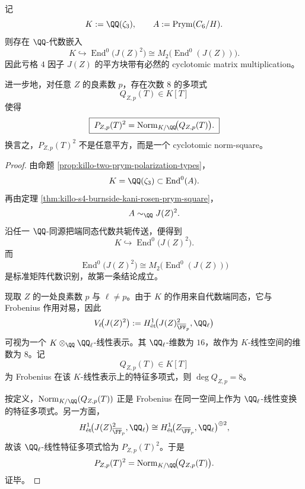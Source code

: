 \begin{conclusion}\label{con:xi-time-part9n-s4-jz2-cyclotomic-norm-square}
记
\[
K:=\QQ(\zeta_3),\qquad A:=\operatorname{Prym}(C_6/H).
\]
则存在 \(\QQ\)-代数嵌入
\[
\boxed{\;
K\hookrightarrow \operatorname{End}^0\!\bigl(J(Z)^2\bigr)
\cong
M_2\!\bigl(\operatorname{End}^0(J(Z))\bigr).
\;}
\]
因此亏格 \(4\) 因子 \(J(Z)\) 的平方块带有必然的 cyclotomic matrix multiplication。

进一步地，对任意 \(Z\) 的良素数 \(p\)，存在次数 \(8\) 的多项式
\[
Q_{Z,p}(T)\in K[T]
\]
使得
\[
\boxed{\;
P_{Z,p}(T)^2=
\operatorname{Norm}_{K/\QQ}\!\bigl(Q_{Z,p}(T)\bigr).
\;}
\]
换言之，\(P_{Z,p}(T)^2\) 不是任意平方，而是一个 cyclotomic norm-square。
\end{conclusion}
\begin{proof}
由命题 \ref{prop:killo-two-prym-polarization-types}，
\[
K=\QQ(\zeta_3)\subset \operatorname{End}^0(A).
\]
再由定理 \ref{thm:killo-s4-burnside-kani-rosen-prym-square}，
\[
A\sim_{\QQ}J(Z)^2.
\]
沿任一 \(\QQ\)-同源把端同态代数共轭传送，便得到
\[
K\hookrightarrow \operatorname{End}^0\!\bigl(J(Z)^2\bigr).
\]
而
\[
\operatorname{End}^0\!\bigl(J(Z)^2\bigr)\cong M_2\!\bigl(\operatorname{End}^0(J(Z))\bigr)
\]
是标准矩阵代数识别，故第一条结论成立。

现取 \(Z\) 的一处良素数 \(p\) 与 \(\ell\neq p\)。由于 \(K\) 的作用来自代数端同态，它与 Frobenius 作用对易，因此
\[
V_\ell\!\bigl(J(Z)^2\bigr):=
H^1_{\text{ét}}\!\bigl(J(Z)^2_{\overline{\FF}_p},\QQ_\ell\bigr)
\]
可视为一个 \(K\otimes_{\QQ}\QQ_\ell\)-线性表示。其 \(\QQ_\ell\)-维数为 \(16\)，故作为 \(K\)-线性空间的维数为 \(8\)。记
\[
Q_{Z,p}(T)\in K[T]
\]
为 Frobenius 在该 \(K\)-线性表示上的特征多项式，则 \(\deg Q_{Z,p}=8\)。

按定义，\(\operatorname{Norm}_{K/\QQ}(Q_{Z,p}(T))\) 正是 Frobenius 在同一空间上作为 \(\QQ_\ell\)-线性变换的特征多项式。另一方面，
\[
H^1_{\text{ét}}\!\bigl(J(Z)^2_{\overline{\FF}_p},\QQ_\ell\bigr)
\cong
H^1_{\text{ét}}\!\bigl(Z_{\overline{\FF}_p},\QQ_\ell\bigr)^{\oplus 2},
\]
故该 \(\QQ_\ell\)-线性特征多项式恰为 \(P_{Z,p}(T)^2\)。于是
\[
P_{Z,p}(T)^2=
\operatorname{Norm}_{K/\QQ}\!\bigl(Q_{Z,p}(T)\bigr).
\]
证毕。
\end{proof}

